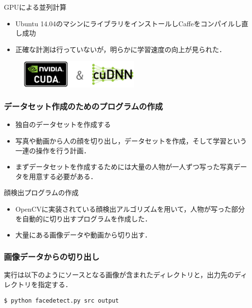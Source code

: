 \documentclass[dvipdfmx,11pt,notheorems]{beamer}
\theoremstyle{definition}
\begin{document}
\begin{frame}[fragile]
\begin{frame}
\begin{block}{GPUによる並列計算}
\begin{itemize}
\item Ubuntu 14.04のマシンにライブラリをインストールしCaffeをコンパイルし直し成功
\item 正確な計測は行っていないが，明らかに学習速度の向上が見られた．
\end{itemize}
\end{block}

\begin{figure}[tb]
  \begin{center}
    \includegraphics[clip,width=6cm]{./fig/eps/GPU.eps}
  \end{center}
\end{figure}

\end{frame}

\begin{frame}\frametitle{データセット作成のためのプログラムの作成}
\begin{itemize}
\item 独自のデータセットを作成する
\item 写真や動画から人の顔を切り出し，データセットを作成，そして学習という一連の操作を行う計画．
\item まずデータセットを作成するためには大量の人物が一人ずつ写った写真データを用意する必要がある．
\end{itemize}
\begin{exampleblock}{顔検出プログラムの作成}
\begin{itemize}
\item OpenCVに実装されている顔検出アルゴリズムを用いて，人物が写った部分を自動的に切り出すプログラムを作成した．
\item 大量にある画像データや動画から切り出す．
\end{itemize}
\end{exampleblock}
\end{frame}

\begin{frame}[fragile]\frametitle{画像データからの切り出し}
実行は以下のようにソースとなる画像が含まれたディレクトリと，出力先のディレクトリを指定する．

\begin{lstlisting}[basicstyle=\ttfamily\footnotesize, frame=single,xleftmargin=5mm]
$ python facedetect.py src output
\end{lstlisting}


\end{frame}
\end{frame}
\end{document}
